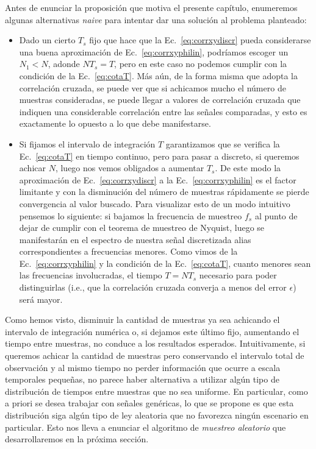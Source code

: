 \documentclass{article}
\begin{document}
Antes de enunciar la proposición que motiva el presente capítulo, enumeremos algunas alternativas \emph{naive} para intentar dar una solución al problema planteado:
\begin{itemize}
    \item Dado un cierto $T_s$ fijo que hace que la Ec.~\ref{eq:corrxydiscr} pueda considerarse una buena aproximación de Ec.~\ref{eq:corrxyphilin}, podríamos escoger un $N_1 < N$, adonde $N T_s = T$, pero en este caso no podemos cumplir con la condición de la Ec.~\ref{eq:cotaT}. Más aún, de la forma misma que adopta la correlación cruzada, se puede ver que si achicamos mucho el número de muestras consideradas, se puede llegar a valores de correlación cruzada que indiquen una considerable correlación entre las señales comparadas, y esto es exactamente lo opuesto a lo que debe manifestarse.
    
    \item Si fijamos el intervalo de integración $T$ garantizamos que se verifica la Ec.~\ref{eq:cotaT} en tiempo continuo, pero para pasar a discreto, si queremos achicar $N$, luego nos vemos obligados a aumentar $T_s$. De este modo la aproximación de Ec.~\ref{eq:corrxydiscr} a la Ec.~\ref{eq:corrxyphilin} es el factor limitante y con la disminución del número de muestras rápidamente se pierde convergencia al valor buscado. Para visualizar esto de un modo intuitivo pensemos lo siguiente: si bajamos la frecuencia de muestreo $f_s$ al punto de dejar de cumplir con el teorema de muestreo de Nyquist, luego se manifestarán en el espectro de nuestra señal discretizada alias correspondientes a frecuencias menores. Como vimos de la Ec.~\ref{eq:corrxyphilin} y la condición de la Ec.~\ref{eq:cotaT}, cuanto menores sean las frecuencias involucradas, el tiempo $T=N T_s$ necesario para poder distinguirlas (i.e., que la correlación cruzada converja a menos del error $\epsilon$) será mayor.   
\end{itemize}

Como hemos visto, disminuir la cantidad de muestras ya sea achicando el intervalo de integración numérica o, si dejamos este último fijo, aumentando el tiempo entre muestras, no conduce a los resultados esperados. Intuitivamente, si queremos achicar la cantidad de muestras pero conservando el intervalo total de observación y al mismo tiempo no perder información que ocurre a escala temporales pequeñas, no parece haber alternativa a utilizar algún tipo de distribución de tiempos entre muestras que no sea uniforme. En particular, como a priori se desea trabajar con señales genéricas, lo que se propone es que esta distribución siga algún tipo de ley aleatoria que no favorezca ningún escenario en particular. Esto nos lleva a enunciar el algoritmo de \emph{muestreo aleatorio} que desarrollaremos en la próxima sección.
\end{document}
